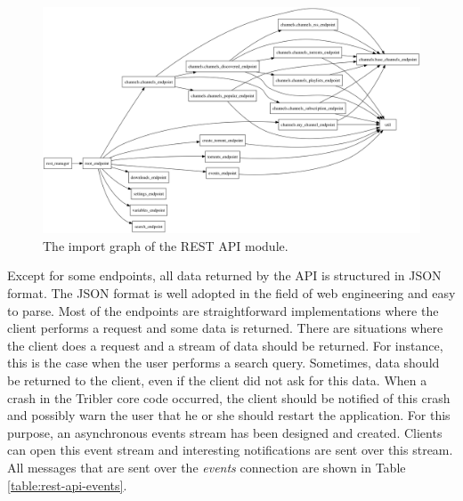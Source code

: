 \begin{figure}[h!]
	\centering
	\includegraphics[width=1.0\columnwidth]{images/improving_qa/importgraph_api}
	\caption{The import graph of the REST API module.}
	\label{fig:importgraph-api}
\end{figure}

Except for some endpoints, all data returned by the API is structured in JSON format. The JSON format is well adopted in the field of web engineering and easy to parse. Most of the endpoints are straightforward implementations where the client performs a request and some data is returned. There are situations where the client does a request and a stream of data should be returned. For instance, this is the case when the user performs a search query. Sometimes, data should be returned to the client, even if the client did not ask for this data. When a crash in the Tribler core code occurred, the client should be notified of this crash and possibly warn the user that he or she should restart the application. For this purpose, an asynchronous events stream has been designed and created. Clients can open this event stream and interesting notifications are sent over this stream. All messages that are sent over the \emph{events} connection are shown in Table \ref{table:rest-api-events}.\\

